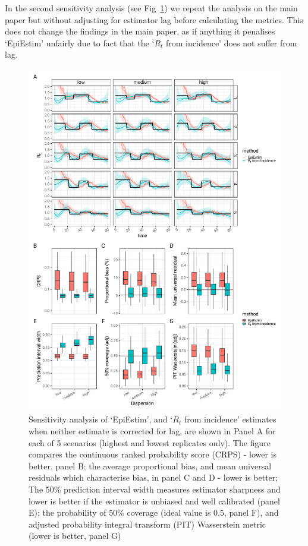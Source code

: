 \documentclass[a4paper, 12pt, twoside]{article}
\begin{document}
In the second sensitivity analysis (see Fig~\ref{fig:S6}) we repeat the analysis on the main paper but without adjusting for estimator lag before calculating the metrics. This does not change the findings in the main paper, as if anything it penalises `EpiEstim' unfairly due to fact that the `$R_t$ from incidence' does not suffer from lag.

\begin{figure}[h!]
\centering
  \includegraphics{fig/fig6-not-lagged-scenario}
  \caption{Sensitivity analysis of `EpiEstim', and `$R_t$ from incidence' estimates when neither estimate is corrected for lag, are shown in Panel A for each of 5 scenarios (highest and lowest replicates only). The figure compares the continuous ranked probability score (CRPS) - lower is better, panel B; the average proportional bias, and mean universal residuals which characterise bias, in panel C and D - lower is better; The 50\% prediction interval width measures estimator sharpness and lower is better if the estimator is unbiased and well calibrated (panel E); the probability of 50\% coverage (ideal value is 0.5, panel F), and adjusted probability integral transform (PIT) Wasserstein metric (lower is better, panel G) }
\label{fig:S6}
\end{figure}


\end{document}
